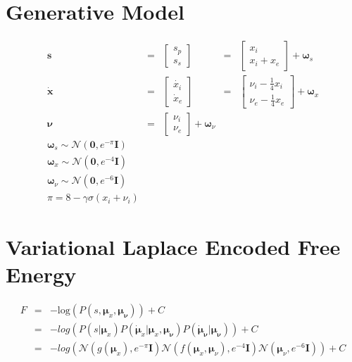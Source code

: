 \documentclass[11pt]{article}
\begin{document}
\section*{Generative Model}
$$
\begin{array}{lllll}
    \mathbf{s} &=&  \left[\begin{array}{c} s_p \\ s_s\end{array}\right] &= &
    \left[\begin{array}{c} x_i \\ x_i + x_e \end{array}\right] +
    \bm{\omega}_s \\
    \mathbf{\dot{x}} &=&  \left[\begin{array}{c} \dot{x_i} \\ \dot{x}_e
    \end{array}\right]  &=& \left[\begin{array}{c} \nu_i -\frac{1}{4}
    x_i\\ \nu_e -\frac{1}{4} x_e\end{array}\right] + \bm{\omega}_x
    \\ \bm{\nu} &=& \left[\begin{array}{c} \nu_i \\ \nu_e \end{array}\right] +
    \bm{\omega}_{\nu}\\
    \bm{\omega}_s \sim \mathcal{N}(\mathbf{0}, e^{-\pi} \mathbf{I})\\
    \bm{\omega}_x \sim \mathcal{N}(\mathbf{0}, e^{-4} \mathbf{I})\\
    \bm{\omega}_\nu \sim \mathcal{N}(\mathbf{0}, e^{-6} \mathbf{I})\\
    \pi = 8-\gamma\sigma(x_i + \nu_i)
\end{array}
$$

\section*{Variational Laplace Encoded Free Energy}

$$
    \begin{array}{lll}
        F &= &-\mathrm{log}(P(s,\bm{\mu}_x, \bm{\mu}_{\bm{\nu}} )) + C \\
          &= & -log( P(s|\bm{\mu}_x) P(\dot{\bm{\mu}}_{x}|\bm{\mu}_x,
          \bm{\mu}_{\bm{\nu}}) P(\dot{\bm{\mu}}_{\bm{\nu}}|\bm{\mu}_{\bm{\nu}}))
          + C  \\
        & = & -log( \mathcal{N}( g(\bm{\mu}_x),  e^{-\pi}\mathbf{I})
        \mathcal{N}( f(\bm{\mu}_x,\bm{\mu}_\nu), e^{-4}\mathbf{I})
        \mathcal{N}(\bm{\mu}_{\nu}, e^{-6}\mathbf{I}) ) + C  \\
    \end{array}
$$
\end{document}

